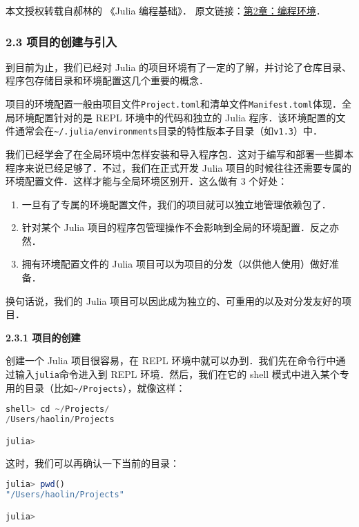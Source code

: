 
本文授权转载自郝林的 《Julia 编程基础》． 原文链接：\href{https://github.com/hyper0x/JuliaBasics/blob/master/book/ch02.md}{第2章：编程环境}．


\subsubsection{2.3 项目的创建与引入}

到目前为止，我们已经对 Julia 的项目环境有了一定的了解，并讨论了仓库目录、程序包存储目录和环境配置这几个重要的概念．

项目的环境配置一般由项目文件\verb|Project.toml|和清单文件\verb|Manifest.toml|体现．全局环境配置针对的是 REPL 环境中的代码和独立的 Julia 程序．该环境配置的文件通常会在\verb|~/.julia/environments|目录的特性版本子目录（如\verb|v1.3|）中．

我们已经学会了在全局环境中怎样安装和导入程序包．这对于编写和部署一些脚本程序来说已经足够了．不过，我们在正式开发 Julia 项目的时候往往还需要专属的环境配置文件．这样才能与全局环境区别开．这么做有 3 个好处：

\begin{enumerate}
\item 一旦有了专属的环境配置文件，我们的项目就可以独立地管理依赖包了．
\item 针对某个 Julia 项目的程序包管理操作不会影响到全局的环境配置．反之亦然．
\item 拥有环境配置文件的 Julia 项目可以为项目的分发（以供他人使用）做好准备．
\end{enumerate}

换句话说，我们的 Julia 项目可以因此成为独立的、可重用的以及对分发友好的项目．

\textbf{2.3.1 项目的创建}

创建一个 Julia 项目很容易，在 REPL 环境中就可以办到．我们先在命令行中通过输入\verb|julia|命令进入到 REPL 环境．然后，我们在它的 shell 模式中进入某个专用的目录（比如\verb|~/Projects|），就像这样：

\begin{lstlisting}[language=julia]
shell> cd ~/Projects/
/Users/haolin/Projects

julia> 
\end{lstlisting}

这时，我们可以再确认一下当前的目录：

\begin{lstlisting}[language=julia]
julia> pwd()
"/Users/haolin/Projects"

julia> 
\end{lstlisting}

